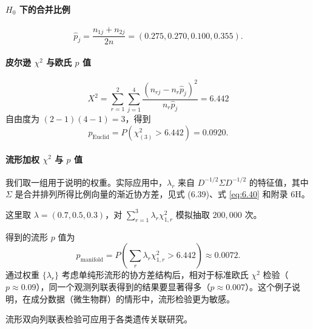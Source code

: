 \paragraph{\texorpdfstring{$H_0$}{H₀} 下的合并比例}

\[
  \hat p_j=\frac{n_{1j}+n_{2j}}{2n}=(0.275,0.270,0.100,0.355).
\]

\paragraph{皮尔逊 \texorpdfstring{$\chi^2$}{χ²} 与欧氏 \texorpdfstring{$p$}{p} 值}

\[
  X^2=\sum_{r=1}^{2}\sum_{j=1}^{4}\frac{(n_{rj}-n_r\hat p_j)^2}{n_r\hat p_j}
       =6.442
\]
自由度为 $(2-1)(4-1)=3$，得到
\[
  p_{\mathrm{Euclid}}=P(\chi_{(3)}^2>6.442)=0.0920.
\]

\paragraph{流形加权 \texorpdfstring{$\chi^2$}{χ²} 与 \texorpdfstring{$p$}{p} 值}

我们取一组用于说明的权重。实际应用中，$\lambda_r$ 来自 $D^{-1/2}\Sigma D^{-1/2}$ 的特征值，其中 $\Sigma$ 是合并排列所得比例向量的渐近协方差，见式 (6.39)、式 \eqref{eq:6.40} 和附录 6H。

这里取 $\lambda=(0.7,0.5,0.3)$，对 $\sum_{r=1}^3\lambda_r\chi_{1,r}^2$ 模拟抽取 $200{,}000$ 次。

得到的流形 $p$ 值为
\[
  p_{\mathrm{manifold}}=P\left(\sum_r\lambda_r\chi_{1,r}^2>6.442\right)\approx 0.0072.
\]
通过权重 $\{\lambda_r\}$ 考虑单纯形流形的协方差结构后，相对于标准欧氏 $\chi^2$ 检验（$p\approx0.09$），同一个观测列联表得到的结果要显著得多（$p\approx0.007$）。这个例子说明，在成分数据（微生物群）的情形中，流形检验更为敏感。

流形双向列联表检验可应用于各类遗传关联研究。
